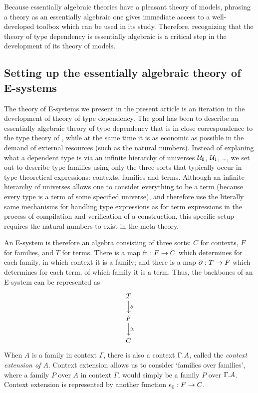 \documentclass{article}
\begin{document}
Because essentially algebraic theories have a pleasant theory of models, 
phrasing a theory as an essentially algebraic one gives immediate access to
a well-developed toolbox which can be used in its study. Therefore, recognizing
that the theory of type dependency is essentially algebraic is a critical step
in the development of its theory of models.

\subsection*{Setting up the essentially algebraic theory of E-systems}
The theory of E-systems we present in the present article is an iteration in the
development of theory of type
dependency. The goal has been to describe an essentially algebraic theory of
type dependency that is in close correspondence to the type theory of
\cite{TheBook}, while at the same time it is as economic as possible in the
demand of external resources (such as the natural numbers). Instead of explaning
what a dependent type is via an infinite hierarchy of universes $\mathcal{U}_0$,
$\mathcal{U}_1$, \ldots, we set out to describe type families using only the three sorts
that typically occur in type theoretical expressions: contexts, families and 
terms. Although an infinite hierarchy of universes allows one to consider everything
to be a term (because every type is a term of some specified universe), and 
therefore use the literally same mechanisms for handling type expressions as for
term expressions in the process of compilation and verification of a 
construction, this specific setup requires the natural numbers to exist in the 
meta-theory. 

An E-system is therefore an algebra consisting of three sorts: $C$ for contexts,
$F$ for families, and $T$ for terms. There is a map 
$\mathrm{ft}_{}:F\to C$ which determines for each family, in which context it is a
family; and there is a map $\partial_{}:T\to F$ which determines for each term, of
which family it is a term. Thus, the backbones of an E-system can be represented
as
\begin{equation*}
\begin{tikzcd}
T \arrow[d,"\ebd"] \\ F \arrow[d,"\eft"] \\ C
\end{tikzcd}
\end{equation*}
When $A$ is a family in context $\Gamma$, there is also a context $\ctxext{\Gamma}{A}$,
called the \emph{context extension of $A$}. Context extension allows us to consider
`families over families', where a family $P$ over $A$ in context $\Gamma$, would
simply be a family $P$ over $\ctxext{\Gamma}{A}$. Context extension is represented
by another function $\epsilon_{0}^{} : F\to C$.
\end{document}
